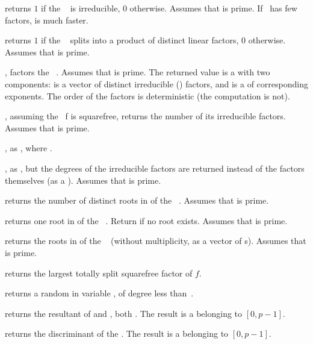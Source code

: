  returns $1$ if the ~
is irreducible, $0$ otherwise. Assumes that  is prime. If~ has
few factors,  is much faster.

 returns $1$ if the
~ splits into a product of distinct linear factors, $0$
otherwise. Assumes that  is prime.

, factors the ~. Assumes
that  is prime. The returned value  is a  with two
components:  is a vector of distinct irreducible ()
factors, and  is a  of corresponding exponents. The
order of the factors is deterministic (the computation is not).

, assuming the ~f is squarefree,
returns the number of its irreducible factors. Assumes that  is prime.

, as ,
where .

, as , but the
degrees of the irreducible factors are returned instead of the factors
themselves (as a ). Assumes that  is prime.

 returns the number of distinct
roots in  of the ~. Assumes that  is prime.

 returns one root in  of
the ~. Return  if no root exists.
Assumes that  is prime.

 returns the roots in  of
the ~ (without multiplicity, as a vector of s).
Assumes that  is prime.

 returns the largest totally split
squarefree factor of $f$.

 returns a random 
in variable , of degree less than~.

 returns the resultant
of  and , both . The result is a 
belonging to $[0,p-1]$.

 returns the discriminant
of the  . The result is a  belonging to $[0,p-1]$.

